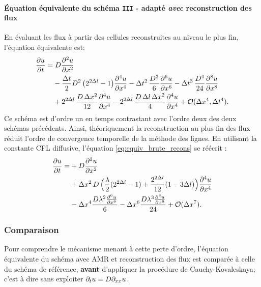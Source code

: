 \paragraph{Équation équivalente du schéma \texttt{III} - adapté \emph{avec} reconstruction des flux}
    En évaluant les flux à partir des cellules reconstruites au niveau le plus fin, l'équation équivalente est:
    \begin{align}\label{eq:equiv_brute_recons}
        \frac{\partial u}{\partial t} =&\; D \frac{\partial^2 u}{\partial x^2} \\\notag
        &- \frac{\Delta t}{2} D^2\, \bigl( 2^{2\Delta l}- 1 \bigr)          \frac{\partial^4 u}{\partial x^4}
        - \Delta t^2\, \frac{D^3}{6}          \frac{\partial^6 u}{\partial x^6}
        - \Delta t^3\, \frac{D^4}{24}         \frac{\partial^8 u}{\partial x^8} \\\notag
        &+ 2^{2\Delta l}\, \frac{D\, \Delta x^2}{12}    \frac{\partial^4 u}{\partial x^4}
        - 2^{2\Delta l}\, \frac{D\, \Delta l\, \Delta x^2}{4} \frac{\partial^4 u}{\partial x^4} + \mathcal{O}(\Delta x^4 , \Delta t^4).
    \end{align}
    Ce schéma est d'ordre un en temps contrastant avec l'ordre deux des deux schémas précédents.
    Ainsi, théoriquement la reconstruction au plus fin des flux réduit l'ordre de convergence temporelle de la méthode des lignes.
    En utilisant la constante CFL diffusive, l'équation \eqref{eq:equiv_brute_recons} se réécrit : 
    \begin{align}\label{eq:equiv_cfl_recons}
        \frac{\partial u}{\partial t}
        =&+ D \frac{\partial^{2}u}{\partial x^{2}}\\\notag
        &+ \Delta x^{2}\, D \, \Bigl( 
        \frac{\lambda}{2} (2^{2 \Delta l} - 1) + \frac{2^{2 \Delta l} }{12} (1 - 3 \Delta l)
        \Bigr)\frac{\partial^{4}u}{\partial x^{4}}\\\notag
        & - \Delta x^{4} \frac{D \lambda^{2} \frac{\partial^{6}u}{\partial x^{6}}}{6} - \Delta x^{6} \frac{D \lambda^{3} \frac{\partial^{8}u}{\partial x^{8}}}{24}
        + \mathcal{O}(\Delta x^7). 
    \end{align}
\subsubsection{Comparaison}
    Pour comprendre le mécanisme menant à cette perte d'ordre,
    l'équation équivalente du schéma avec AMR et reconstruction des flux est comparée à celle du schéma de référence, 
    \textbf{avant} d'appliquer la procédure de Cauchy-Kovaleskaya; c'est à dire sans exploiter $\partial_t u=D \partial_{xx} u$.
